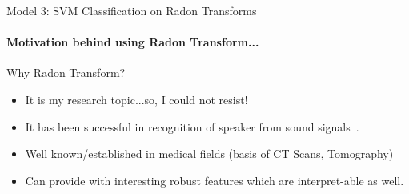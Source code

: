 \documentclass{beamer}
\begin{document}
\begin{frame}{Model 3: SVM Classification on Radon Transforms}
  \framesubtitle{Motivation behind using Radon Transform...}

  \begin{block}{Why Radon Transform?}
    \begin{itemize}
  \item It is my research topic...so, I could not resist!
  \item It has been successful in recognition of speaker from sound
    signals~\cite{ajmera_text-independent_2011-2}.

  \item Well known/established in medical fields (basis of CT Scans, Tomography)

  \item Can provide with interesting robust features which are interpret-able as well.
    \end{itemize}
  \end{block}

\end{frame}
\end{document}
